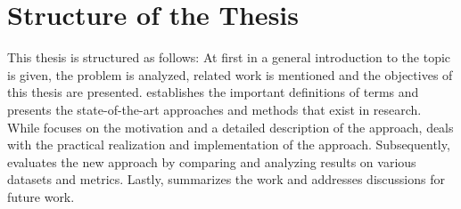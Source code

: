 \section{Structure of the Thesis}
\label{sec:structure_of_thesis}

This thesis is structured as follows:
At first in \textbf{} a general introduction to the topic is given, the problem is analyzed, related work is mentioned and the objectives of this thesis are presented.
\textbf{} establishes the important definitions of terms and presents the state-of-the-art approaches and methods that exist in research.
While \textbf{} focuses on the motivation and a detailed description of the approach, \textbf{} deals with the practical realization and implementation of the approach.
Subsequently, \textbf{} evaluates the new approach by comparing and analyzing results on various datasets and metrics.
Lastly, \textbf{} summarizes the work and addresses discussions for future work.
